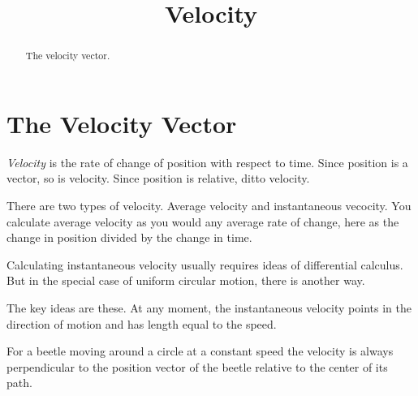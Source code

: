\documentclass{ximera}
\title{Velocity}
\begin{document}
\begin{abstract}
The velocity vector.
\end{abstract}
\maketitle



\section{The Velocity Vector}
\emph{Velocity} is the rate of change of position with respect to time. Since position is a vector, so is velocity. Since position is relative, ditto velocity. 

There are two types of velocity. Average velocity and instantaneous vecocity. You calculate average velocity as you would any average rate of change, here as the change in position divided by the change in time.

Calculating instantaneous velocity usually requires ideas of differential calculus. But in the special case of uniform circular motion, there is another way.

The key ideas are these. At any moment, the instantaneous velocity points in the direction of motion and has length equal to the speed.

For a beetle moving around a circle at a constant speed the velocity is always perpendicular to the position vector of the beetle relative to the center of its path.
\end{document}

